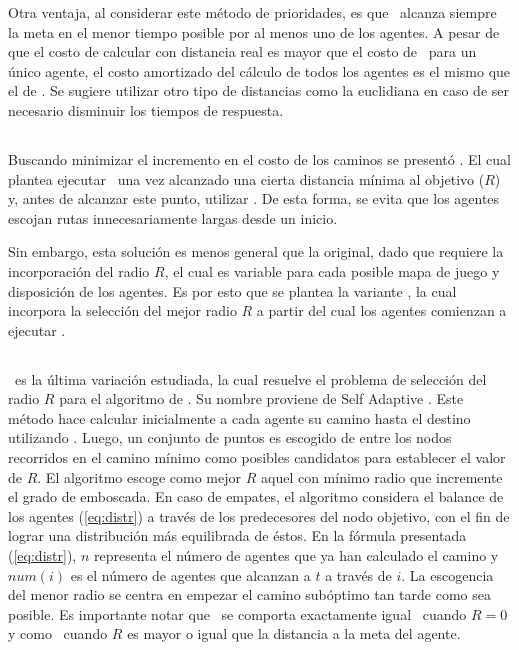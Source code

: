 Otra ventaja, al considerar este m\'etodo de prioridades, es que
\pambush\ alcanza siempre la meta en el menor tiempo posible por al
menos uno de los agentes. A pesar de que el costo de calcular
\pambush con distancia real es mayor que el costo de \ambush\ 
para un \'unico agente, el costo amortizado del c\'alculo de
todos los agentes es el mismo que el de \ambush. Se sugiere
utilizar otro tipo de distancias como la euclidiana en caso
de ser necesario disminuir los tiempos de respuesta.

\subsection{\rambush}

Buscando minimizar el incremento en el costo de los caminos
se present\'o \rambush. El cual plantea ejecutar \ambush\ una
vez alcanzado una cierta distancia m\'inima al objetivo ($R$) y,
antes de alcanzar este punto, utilizar \astar. De esta forma,
se evita que los agentes escojan rutas innecesariamente largas
desde un inicio.

Sin embargo, esta soluci\'on es menos general que la original,
dado que requiere la incorporaci\'on del radio $R$, el cual es
variable para cada posible mapa de juego y disposici\'on de los
agentes. Es por esto que se plantea la variante \sarambush, la
cual incorpora la selecci\'on del mejor radio $R$ a partir del
cual los agentes comienzan a ejecutar \ambush.

\subsection{\sarambush}

\sarambush\ es la \'ultima variaci\'on estudiada, la cual
resuelve el problema de selecci\'on del radio $R$ para el
algoritmo de \rambush. Su nombre proviene de Self Adaptive
\rambush. Este m\'etodo hace calcular inicialmente a cada
agente su camino hasta el destino utilizando \astar. Luego,
un conjunto de puntos es escogido de entre los nodos recorridos
en el camino m\'inimo como posibles candidatos para establecer
el valor de $R$. El algoritmo escoge como mejor $R$ aquel
con m\'inimo radio que incremente el grado de emboscada. En
caso de empates, el algoritmo considera el balance de los
agentes (\ref{eq:distr}) a trav\'es de los predecesores del
nodo objetivo, con el fin de lograr una distribuci\'on m\'as
equilibrada de \'estos. 
En la f\'ormula presentada (\ref{eq:distr}), $n$ representa
el n\'umero de agentes que ya han calculado el camino y
$num(i)$ es el n\'umero de agentes que alcanzan a $t$ a trav\'es
de $i$.
La escogencia del menor radio se
centra en empezar el camino sub\'optimo tan tarde como sea
posible. Es importante notar que \rambush\ se comporta exactamente
igual \astar\ cuando $R=0$ y como \ambush\ cuando $R$ es mayor
o igual que la distancia a la meta del agente.

